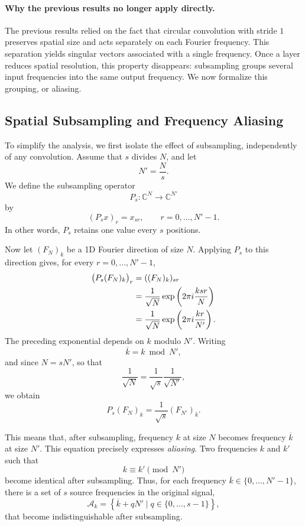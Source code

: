 \paragraph{Why the previous results no longer apply directly.}

The previous results relied on the fact that circular convolution with stride $1$
preserves spatial size and acts separately on each Fourier frequency. This separation
yields singular vectors associated with a single frequency. Once a layer reduces
spatial resolution, this property disappears: subsampling groups several
input frequencies into the same output frequency. We now formalize this
grouping, or aliasing.

\subsection{Spatial Subsampling and Frequency Aliasing}

To simplify the analysis, we first isolate the effect of subsampling, independently of any convolution.
Assume that $s$ divides $N$, and let
\[
    N' = \frac{N}{s}.
\]
We define the subsampling operator
\[
    P_s : \mathbb{C}^N \longrightarrow \mathbb{C}^{N'}
\]
by
\begin{equation*}
    (P_s x)_r = x_{sr},
    \qquad r = 0,\dots,N'-1.
\end{equation*}
In other words, $P_s$ retains one value every $s$ positions.

Now let $(F_N)_k$ be a 1D Fourier direction of size $N$. Applying $P_s$ to this
direction gives, for every $r=0,\dots,N'-1$,
\begin{align*}
    \big(P_s (F_N)_k\big)_r
    &= ((F_N)_k)_{sr} \notag \\
    &= \frac{1}{\sqrt{N}}
       \exp\left(2\pi i \frac{k sr}{N}\right) \notag \\
    &= \frac{1}{\sqrt{N}}
       \exp\left(2\pi i \frac{k r}{N'}\right).
\end{align*}
The preceding exponential depends on $k$ modulo $N'$. Writing
\[
    \overline{k} = k \bmod N',
\]
and since $N=sN'$, so that
\[
    \frac{1}{\sqrt{N}} = \frac{1}{\sqrt{s}}\frac{1}{\sqrt{N'}},
\]
we obtain
\begin{equation}
    P_s (F_N)_k
    =
    \frac{1}{\sqrt{s}}(F_{N'})_{\overline{k}}.
    \label{eq:sous_echantillonnage_fourier_1d}
\end{equation}

This means that, after subsampling, frequency $k$ at size $N$ becomes frequency $\overline{k}$ at size $N'$.
This equation precisely expresses \textit{aliasing}. Two frequencies $k$ and $k'$
such that
\[
    k \equiv k' \pmod{N'}
\]
become identical after subsampling.
Thus, for each frequency $\overline{k} \in \{0,\dots,N'-1\}$, there is a set of $s$ source frequencies
in the original signal,
\[
    \mathcal{A}_k
    =
    \left\{ \overline{k} + qN' \mid q \in \{0,\dots,s-1\} \right\},
\]
that become indistinguishable after subsampling.

